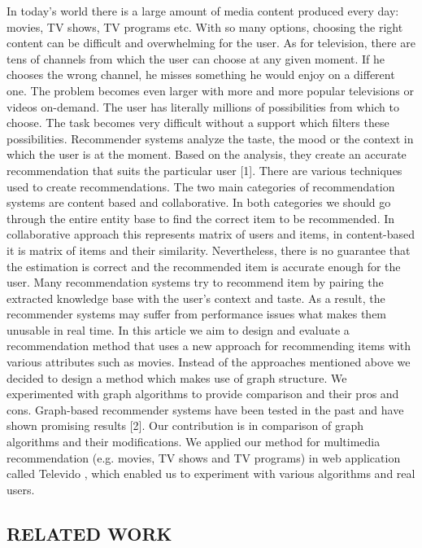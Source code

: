 \documentclass[10pt,slovak,a4paper]{article}
\begin{document}
\begin{multicols}{2}
In today’s world there is a large amount of media content produced every day: movies, TV shows, TV programs etc. With so many options, choosing the right content can be difficult and overwhelming for the user. As for television, there are tens of channels from which the user can choose at any given moment. If he chooses the wrong channel, he misses something he would enjoy on a different one. The problem becomes even larger with more and more popular televisions or videos on-demand. The user has literally millions of possibilities from which to choose. The task becomes very difficult without a support which filters these possibilities.
Recommender systems analyze the taste, the mood or the context in which the user is at the moment. Based on the analysis, they create an accurate recommendation that suits the particular user [1]. There are various techniques used to create recommendations. The two main categories of recommendation systems are content based and collaborative. In both categories we should go through the entire entity base to find the correct item to be recommended. In collaborative approach this represents matrix of users and items, in content-based it is matrix of items and their similarity. Nevertheless, there is no guarantee that the estimation is correct and the recommended item is accurate enough for the user. Many recommendation systems try to recommend item by pairing the extracted knowledge base with the user’s context and taste. As a result, the recommender systems may suffer from performance issues what makes them unusable in real time.
In this article we aim to design and evaluate a recommendation method that uses a new approach for recommending items with various attributes such as movies. Instead of the approaches mentioned above we decided to design a method which makes use of graph structure. We experimented with graph algorithms to provide comparison and their pros and cons. Graph-based recommender systems have been tested in the past and have shown promising results [2]. Our contribution is in comparison of graph algorithms and their modifications. We applied our method for multimedia recommendation (e.g. movies, TV shows and TV programs) in web application called Televido  , which enabled us to experiment with various algorithms and real users.



\begin{small}

\centering \section{RELATED WORK}


\end{small}
\end{multicols}
\end{document}
